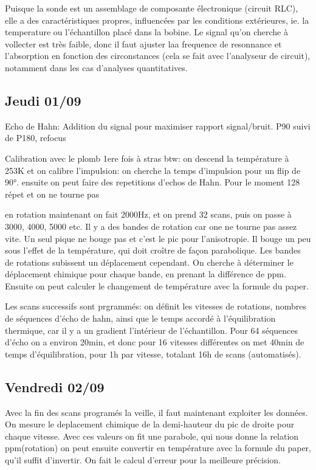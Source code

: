 \documentclass{article}
\begin{document}
Puisque la sonde est un assemblage de composante électronique (circuit RLC), elle a des caractéristiques propres, influencées par les conditions extérieures, ie. la temperature ou l'échantillon placé dans la bobine. Le signal qu'on cherche à vollecter est très faible, donc il faut ajuster laa frequence de resonnance et l'absorption en fonction des circonstances (cela se fait avec l'analyseur de circuit), notamment dans les cas d'analyses quantitatives.

\subsection{Jeudi 01/09}

Echo de Hahn: Addition du signal pour maximiser rapport signal/bruit. P90 suivi de P180, refocus

Calibration avec le plomb 1ere fois à stras btw: on descend la température à 253K et on calibre l'impulsion: on cherche la temps d'impulsion pour un flip de 90°. ensuite on peut faire des repetitions d'echos de Hahn. Pour le moment 128 répet et on ne tourne pas

en rotation maintenant on fait 2000Hz, et on prend 32 scans, puis on passe à 3000, 4000, 5000 etc. 
Il y a des bandes de rotation car one ne tourne pas assez vite. Un seul pique ne bouge pas et c'est le pic pour l'anisotropie. Il bouge un peu sous l'effet de la température, qui doit croître de façon parabolique. Les bandes de rotations subissent un déplacement cependant. On cherche à déterminer le déplacement chimique pour chaque bande, en prenant la différence de ppm. Ensuite on peut calculer le changement de température avec la formule du paper.

Les scans successifs sont prgrammés: on définit les vitesses de rotations, nombres de séquences d'écho de hahn, ainsi que le temps accordé à l'équilibration thermique, car il y a un gradient l'intérieur de l'échantillon. Pour 64 séquences d'écho on a environ 20min, et donc pour 16 vitesses différentes on met 40min de temps d'équilibration, pour 1h par vitesse, totalant 16h de scans (automatisés).

\subsection{Vendredi 02/09}

Avec la fin des scans programés la veille, il faut maintenant exploiter les données. On mesure le deplacement chimique de la demi-hauteur du pic de droite pour chaque vitesse. Avec ces valeurs on fit une parabole, qui nous donne la relation ppm(rotation) on peut ensuite convertir en température avec la formule du paper, qu'il suffit d'invertir. On fait le calcul d'erreur pour la meilleure précision.
\end{document}
